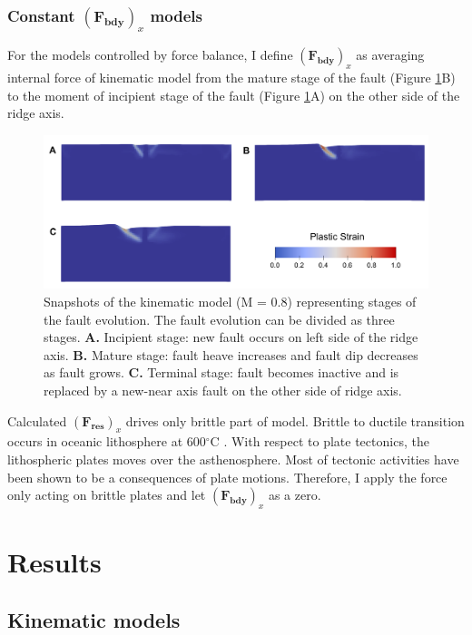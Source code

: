 \documentclass[letterpaper,12pt,notitle]{memphisthesis}                     %
\begin{document}
\subsection{Constant $(\boldsymbol{F_{bdy}})_x$ models}

For the models controlled by force balance, I define $(\boldsymbol{F_{bdy}})_x$ as averaging internal force of kinematic model from the mature stage of the fault (Figure \ref{fig:faultstage}B) to the moment of incipient stage of the fault  (Figure \ref{fig:faultstage}A) on the other side of the ridge axis.
%
\begin{figure}[!htb]
	\centering
	\includegraphics[width=0.9\linewidth]{./figs/fault_stage.pdf}
	\caption{Snapshots of the kinematic model (M = 0.8) representing stages of the fault evolution. The fault evolution can be divided as three stages. \textbf{A.} Incipient stage: new fault occurs on left side of the ridge axis. \textbf{B.} Mature stage: fault heave increases and fault dip decreases as fault grows. \textbf{C.} Terminal stage: fault becomes inactive and is replaced by a new-near axis fault on the other side of ridge axis.}
	\label{fig:faultstage}
\end{figure}

Calculated $(\boldsymbol{F_{res}})_x$ drives only brittle part of model. Brittle to ductile transition occurs in oceanic lithosphere at 600$^\circ$C \citep{Violay2012}. With respect to plate tectonics, the lithospheric plates moves over the asthenosphere. Most of tectonic activities have been shown to be a consequences of plate motions. Therefore, I apply the force only acting on brittle plates and let $(\boldsymbol{F_{bdy}})_x$ as a zero.

\chapter{Results}

\section{Kinematic models}
\end{document}
